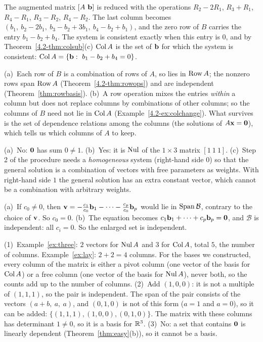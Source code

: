 \documentclass[11pt]{article}
\begin{document}
\begin{description}[leftmargin=0pt,itemsep=5pt]
  \item[Pause and think \ref{think:colplane}.] The augmented matrix $[A\ \mathbf{b}]$ is reduced with the operations $R_2-2R_1$, $R_3+R_1$, $R_4-R_1$, $R_3-R_2$, $R_4-R_2$. The last column becomes $(b_1,\ b_2-2b_1,\ b_3-b_2+3b_1,\ b_4-b_2+b_1)$, and the zero row of $B$ carries the entry $b_1-b_2+b_4$. The system is consistent exactly when this entry is $0$, and by Theorem~\ref{4.2-thm:colsub}(c) $\operatorname{Col} A$ is the set of $\mathbf{b}$ for which the system is consistent: $\Col A=\{\bv{b}:\ b_1-b_2+b_4=0\}$.
  \item[Pause and think \ref{think:rowvscol}.] (a)~Each row of $B$ is a combination of rows of $A$, so lies in $\operatorname{Row} A$; the nonzero rows span $\operatorname{Row} A$ (Theorem~\ref{4.2-thm:rowops}) and are independent (Theorem~\ref{thm:rowbasis}). (b)~A row operation mixes the entries \emph{within} a column but does not replace columns by combinations of other columns; so the columns of $B$ need not lie in $\operatorname{Col} A$ (Example~\ref{4.2-ex:colchange}). What survives is the set of dependence relations among the columns (the solutions of $A\mathbf{x}=\mathbf{0}$), which tells us which columns of $A$ to keep.
  \item[Pause and think \ref{think:affine}.] (a)~No: $\mathbf{0}$ has sum $0\neq1$. (b)~Yes: it is $\operatorname{Nul}$ of the $1\times3$ matrix $[1\ 1\ 1]$. (c)~Step 2 of the procedure needs a \emph{homogeneous} system (right-hand side $0$) so that the general solution is a combination of vectors with free parameters as weights. With right-hand side $1$ the general solution has an extra constant vector, which cannot be a combination with arbitrary weights.
  \item[Pause and think \ref{think:outside}.] (a)~If $c_0\neq0$, then $\mathbf{v}=-\tfrac{c_1}{c_0}\mathbf{b}_1-\cdots-\tfrac{c_p}{c_0}\mathbf{b}_p$ would lie in $\operatorname{Span}\mathcal{B}$, contrary to the choice of $\mathbf{v}$. So $c_0=0$. (b)~The equation becomes $c_1\mathbf{b}_1+\cdots+c_p\mathbf{b}_p=\mathbf{0}$, and $\mathcal{B}$ is independent: all $c_i=0$. So the enlarged set is independent.
  \item[Before the next section.] (1)~Example~\ref{ex:three}: $2$ vectors for $\operatorname{Nul} A$ and $3$ for $\operatorname{Col} A$, total $5$, the number of columns. Example~\ref{ex:lay}: $2+2=4$ columns. For the bases we constructed, every column of the matrix is either a pivot column (one vector of the basis for $\operatorname{Col} A$) or a free column (one vector of the basis for $\operatorname{Nul} A$), never both, so the counts add up to the number of columns. (2)~Add $(1,0,0)$: it is not a multiple of $(1,1,1)$, so the pair is independent. The span of the pair consists of the vectors $(a+b,\ a,\ a)$, and $(0,1,0)$ is not of this form ($a=1$ and $a=0$), so it can be added: $\{(1,1,1),(1,0,0),(0,1,0)\}$. The matrix with these columns has determinant $1\neq0$, so it is a basis for $\mathbb{R}^3$. (3)~No: a set that contains $\mathbf{0}$ is linearly dependent (Theorem~\ref{thm:easy}(b)), so it cannot be a basis.
\end{description}
\end{document}
